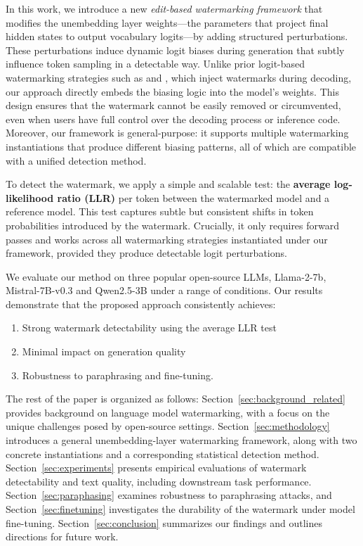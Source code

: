 In this work, we introduce a new \emph{edit-based watermarking framework} that modifies the unembedding layer weights—the parameters that project final hidden states to output vocabulary logits—by adding structured perturbations. These perturbations induce dynamic logit biases during generation that subtly influence token sampling in a detectable way. Unlike prior logit-based watermarking strategies such as \citet{kirchenbauer2023watermark} and \citet{liu2024adaptive}, which inject watermarks during decoding, our approach directly embeds the biasing logic into the model's weights. This design ensures that the watermark cannot be easily removed or circumvented, even when users have full control over the decoding process or inference code. Moreover, our framework is general-purpose: it supports multiple watermarking instantiations that produce different biasing patterns, all of which are compatible with a unified detection method.

To detect the watermark, we apply a simple and scalable test: the \textbf{average log-likelihood ratio (LLR)} per token between the watermarked model and a reference model. This test captures subtle but consistent shifts in token probabilities introduced by the watermark. Crucially, it only requires forward passes and works across all watermarking strategies instantiated under our framework, provided they produce detectable logit perturbations.

We evaluate our method on three popular open-source LLMs, Llama-2-7b, Mistral-7B-v0.3 and Qwen2.5-3B under a range of conditions. Our results demonstrate that the proposed approach consistently achieves:

\begin{enumerate}

    \item Strong watermark detectability using the average LLR test

    \item Minimal impact on generation quality

    \item Robustness to paraphrasing and fine-tuning.

\end{enumerate}

The rest of the paper is organized as follows: Section~\ref{sec:background_related} provides background on language model watermarking, with a focus on the unique challenges posed by open-source settings. Section~\ref{sec:methodology} introduces a general unembedding-layer watermarking framework, along with two concrete instantiations and a corresponding statistical detection method. Section~\ref{sec:experiments} presents empirical evaluations of watermark detectability and text quality, including downstream task performance. Section~\ref{sec:paraphasing} examines robustness to paraphrasing attacks, and Section~\ref{sec:finetuning} investigates the durability of the watermark under model fine-tuning. Section~\ref{sec:conclusion} summarizes our findings and outlines directions for future work.